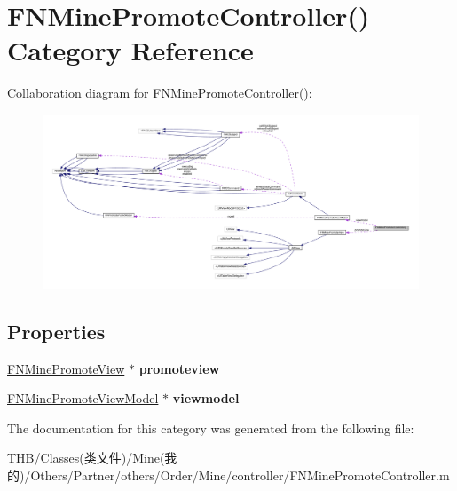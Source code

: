 \hypertarget{category_f_n_mine_promote_controller_07_08}{}\section{F\+N\+Mine\+Promote\+Controller() Category Reference}
\label{category_f_n_mine_promote_controller_07_08}


Collaboration diagram for F\+N\+Mine\+Promote\+Controller()\+:\nopagebreak
\begin{figure}[H]
\begin{center}
\leavevmode
\includegraphics[width=350pt]{category_f_n_mine_promote_controller_07_08__coll__graph}
\end{center}
\end{figure}
\subsection*{Properties}
\begin{DoxyCompactItemize}
\item 
\mbox{\label{category_f_n_mine_promote_controller_07_08_a639ecfae126045ccf3aeba9d00aa39ec}} 
\mbox{\hyperlink{interface_f_n_mine_promote_view}{F\+N\+Mine\+Promote\+View}} $\ast$ {\bfseries promoteview}
\item 
\mbox{\label{category_f_n_mine_promote_controller_07_08_ab01027701cd228c99552edfdb86cc50f}} 
\mbox{\hyperlink{interface_f_n_mine_promote_view_model}{F\+N\+Mine\+Promote\+View\+Model}} $\ast$ {\bfseries viewmodel}
\end{DoxyCompactItemize}


The documentation for this category was generated from the following file\+:\begin{DoxyCompactItemize}
\item 
T\+H\+B/\+Classes(类文件)/\+Mine(我的)/\+Others/\+Partner/others/\+Order/\+Mine/controller/F\+N\+Mine\+Promote\+Controller.\+m\end{DoxyCompactItemize}
